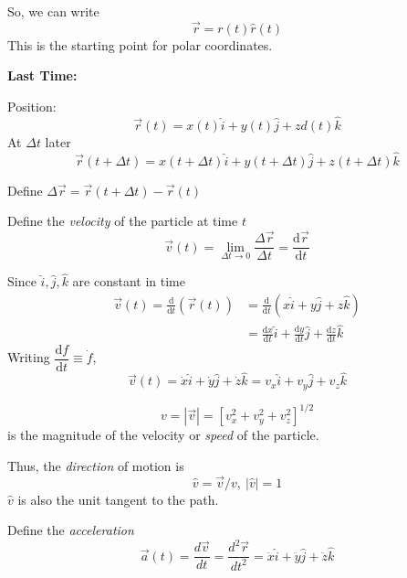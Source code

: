 \documentclass[10pt]{scrartcl}
\begin{document}
 So, we can write 
 \[\vec{r} = r(t)\hat{r}(t)\]
 This is the starting point for polar coordinates.

 \textbf{Last Time:} 

\begin{center}
\end{center}

\setlength{\jot}{8pt}%

Position: 
\[\vec{r}(t) = x(t)\hat{i} + y(t)\hat{j} + zd(t)\hat{k}\]
At $\Delta t$ later
\[\vec{r}(t + \Delta t) = x(t + \Delta t)\hat{i} + y(t + \Delta t)\hat{j} + z(t + \Delta t)\hat{k}\]

\begin{definition}
Define $\Delta \vec{r} = \vec{r}(t + \Delta t) - \vec{r}(t)$

Define the \emph{velocity} of the particle at time $t$
\[\vec{v}(t) = \lim_{\Delta t \to 0} \frac{\Delta \vec{r}}{\Delta t} = \frac{\mathrm{d}\vec{r}}{\mathrm{d}t}\]
\end{definition}

Since $\hat{i},\hat{j},\hat{k}$ are constant in time
\[\begin{aligned}
	\vec{v}(t) = \frac{\mathrm{d}}{\mathrm{d}t}(\vec{r}(t)) &= \frac{\mathrm{d}}{\mathrm{d}t}(x \hat{i} + y\hat{j} + z\hat{k})\\
	&= \frac{\mathrm{d}x}{\mathrm{d}t}\hat{i} + \frac{\mathrm{d}y}{\mathrm{d}t}\hat{j} + \frac{\mathrm{d}z}{\mathrm{d}t}\hat{k}
\end{aligned}
\]
Writing $\dfrac{\mathrm{d}f}{\mathrm{d}t} \equiv \dot{f}$, \[\vec{v}(t) = \dot{x}\hat{i} + \dot{y}\hat{j} + \dot{z}\hat{k} = v_x\hat{i} + v_y\hat{j} + v_z\hat{k}\]

\begin{definition}
\[v = |\vec{v}| = [v_x^2 + v_y^2 + v_z^2]^{1/2}\]
is the magnitude of the velocity or \emph{speed} of the particle.

Thus, the \emph{direction} of motion is 
\[\hat{v} = \vec{v}/v,~ |\hat{v}| = 1\]
$\hat{v}$ is also the unit tangent to the path.

Define the \emph{acceleration}
\[\vec{a}(t) = \frac{d\vec{v}}{dt} = \frac{d^2\vec{r}}{dt^2} = \ddot{x}\hat{i} + \ddot{y}\hat{j} + \ddot{z}\hat{k}\]
\end{definition}
\end{document}
